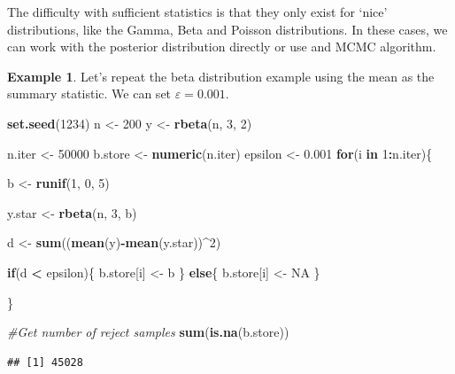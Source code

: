 \documentclass[
]{book}
\newenvironment{Shaded}{\begin{snugshade}}{\end{snugshade}}
\newcommand{\CommentTok}[1]{\textcolor[rgb]{0.56,0.35,0.01}{\textit{#1}}}
\newcommand{\ConstantTok}[1]{\textcolor[rgb]{0.56,0.35,0.01}{#1}}
\newcommand{\ControlFlowTok}[1]{\textcolor[rgb]{0.13,0.29,0.53}{\textbf{#1}}}
\newcommand{\DecValTok}[1]{\textcolor[rgb]{0.00,0.00,0.81}{#1}}
\newcommand{\FloatTok}[1]{\textcolor[rgb]{0.00,0.00,0.81}{#1}}
\newcommand{\FunctionTok}[1]{\textcolor[rgb]{0.13,0.29,0.53}{\textbf{#1}}}
\newcommand{\NormalTok}[1]{#1}
\newcommand{\OtherTok}[1]{\textcolor[rgb]{0.56,0.35,0.01}{#1}}
\newcommand{\SpecialCharTok}[1]{\textcolor[rgb]{0.81,0.36,0.00}{\textbf{#1}}}
\theoremstyle{definition}
\theoremstyle{definition}
\newtheorem{example}{Example}[chapter]
\theoremstyle{definition}
\theoremstyle{definition}
\theoremstyle{remark}
\begin{document}
The difficulty with sufficient statistics is that they only exist for `nice' distributions, like the Gamma, Beta and Poisson distributions. In these cases, we can work with the posterior distribution directly or use and MCMC algorithm.

\begin{example}

Let's repeat the beta distribution example using the mean as the summary statistic. We can set \(\varepsilon = 0.001\).

\begin{Shaded}
\begin{Highlighting}[]
\FunctionTok{set.seed}\NormalTok{(}\DecValTok{1234}\NormalTok{)}
\NormalTok{n }\OtherTok{\textless{}{-}} \DecValTok{200}
\NormalTok{y }\OtherTok{\textless{}{-}} \FunctionTok{rbeta}\NormalTok{(n, }\DecValTok{3}\NormalTok{, }\DecValTok{2}\NormalTok{)}


\NormalTok{n.iter }\OtherTok{\textless{}{-}} \DecValTok{50000}
\NormalTok{b.store }\OtherTok{\textless{}{-}} \FunctionTok{numeric}\NormalTok{(n.iter)}
\NormalTok{epsilon }\OtherTok{\textless{}{-}} \FloatTok{0.001}
\ControlFlowTok{for}\NormalTok{(i }\ControlFlowTok{in} \DecValTok{1}\SpecialCharTok{:}\NormalTok{n.iter)\{}
  
\NormalTok{  b }\OtherTok{\textless{}{-}} \FunctionTok{runif}\NormalTok{(}\DecValTok{1}\NormalTok{, }\DecValTok{0}\NormalTok{, }\DecValTok{5}\NormalTok{)}
  
\NormalTok{  y.star }\OtherTok{\textless{}{-}} \FunctionTok{rbeta}\NormalTok{(n, }\DecValTok{3}\NormalTok{, b)}
  
\NormalTok{  d }\OtherTok{\textless{}{-}} \FunctionTok{sum}\NormalTok{((}\FunctionTok{mean}\NormalTok{(y)}\SpecialCharTok{{-}}\FunctionTok{mean}\NormalTok{(y.star))}\SpecialCharTok{\^{}}\DecValTok{2}\NormalTok{)}
  
  \ControlFlowTok{if}\NormalTok{(d }\SpecialCharTok{\textless{}}\NormalTok{ epsilon)\{}
\NormalTok{    b.store[i] }\OtherTok{\textless{}{-}}\NormalTok{ b}
\NormalTok{  \} }\ControlFlowTok{else}\NormalTok{\{}
\NormalTok{    b.store[i] }\OtherTok{\textless{}{-}} \ConstantTok{NA}
\NormalTok{  \}}
  
\NormalTok{\}}

\CommentTok{\#Get number of reject samples}
\FunctionTok{sum}\NormalTok{(}\FunctionTok{is.na}\NormalTok{(b.store))}
\end{Highlighting}
\end{Shaded}

\begin{verbatim}
## [1] 45028
\end{verbatim}


\end{example}
\end{document}

